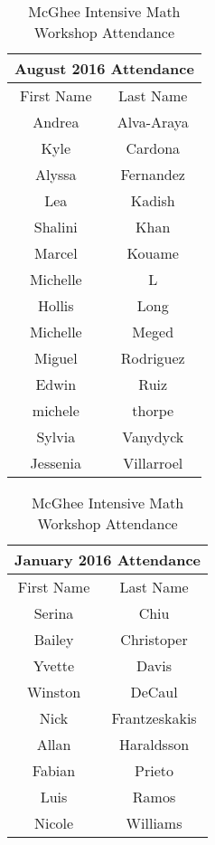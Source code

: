 \documentclass[12pt,dvipsnames]{article}
\begin{document}
        \begin{table}
        	\footnotesize
        	\caption*{McGhee Intensive Math Workshop Attendance}

 	\begin{tabular}{|c|c|}
 		\multicolumn{2}{c}{\bfseries August 2016 Attendance}\\\hline
 		First Name & Last Name\\ 
 		\hline
 		Andrea & Alva-Araya\\ 
 		\hline
 		Kyle & Cardona\\ 
 		\hline
 		Alyssa & Fernandez\\ 
 		\hline
 		Lea & Kadish\\ 
 		\hline
 		Shalini & Khan\\ 
 		\hline
 		Marcel & Kouame\\ 
 		\hline
 		Michelle & L \\ 
 		\hline
 		Hollis & Long\\ 
 		\hline
 		Michelle & Meged\\ 
 		\hline
 		Miguel & Rodriguez\\ 
 		\hline
 		Edwin & Ruiz\\ 
 		\hline
 		michele & thorpe\\ 
 		\hline
 		Sylvia & Vanydyck\\ 
 		\hline
 		Jessenia & Villarroel\\ 
 		\hline\end{tabular}
 \hfill
 	\begin{tabular}{|c|c|}
 	 		\multicolumn{2}{c}{\bfseries January 2016 Attendance}\\\hline
 		First Name & Last Name\\ 
 		\hline
 		Serina  &  Chiu\\ 
 		\hline
 		Bailey  &  Christoper\\ 
 		\hline
 		Yvette  &  Davis\\ 
 		\hline
 		Winston  &  DeCaul\\ 
 		\hline
 		Nick  &  Frantzeskakis\\ 
 		\hline
 		Allan  &  Haraldsson\\ 
 		\hline
 		Fabian  &  Prieto\\ 
 		\hline
 		Luis  &  Ramos\\ 
 		\hline
 		Nicole  &  Williams\\ 

\end{tabular}
\end{table}
\end{document}
